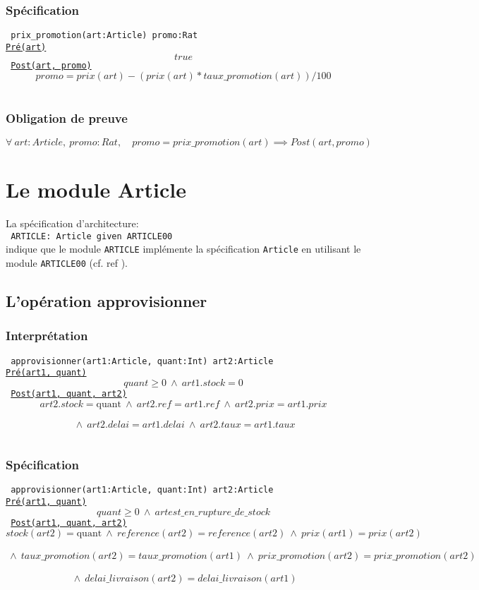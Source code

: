 \documentclass{article}
\begin{document}
\subsubsection{Spécification}
{\tt
prix\_promotion(art:Article) promo:Rat\\
\underline{Pré(art)}
$$ true $$
\underline{Post(art, promo)}
$$ promo = prix(art) - ( prix(art) * taux\_promotion(art) )/100$$
}

\subsubsection{Obligation de preuve}
$$ \forall\ art:Article,\ promo:Rat,\quad promo = prix\_promotion(art) \implies Post(art, promo) $$

\section{Le module Article}
La spécification d'architecture:\\
{\tt
ARTICLE: Article given ARTICLE00\\
}
indique que le module \texttt{ARTICLE} implémente la spécification \texttt{Article} en utilisant le module \texttt{ARTICLE00} (cf. ref \cite{Architectural:specifications:in:CASL}). 

\subsection{L'opération approvisionner}
\subsubsection{Interprétation}
{\tt
approvisionner(art1:Article, quant:Int) art2:Article\\
\underline{Pré(art1, quant)}
$$ quant \ge 0\ \wedge\ art1.stock = 0$$
\underline{Post(art1, quant, art2)}
$$ art2.stock = \text{quant}\ \wedge\ art2.ref = art1.ref\ \wedge\ art2.prix = art1.prix$$
$$ \ \wedge\ art2.delai = art1.delai\ \wedge\  art2.taux = art1.taux$$
}

\subsubsection{Spécification}
{\tt
approvisionner(art1:Article, quant:Int) art2:Article\\
\underline{Pré(art1, quant)}
$$ quant \ge 0\ \wedge\ art est\_en\_rupture\_de\_stock$$
\underline{Post(art1, quant, art2)}
$$ stock(art2) = \text{quant}\ \wedge\ reference(art2) = reference(art2)\ \wedge\ prix(art1) = prix(art2) $$
$$ \ \wedge\ taux\_promotion(art2) = taux\_promotion(art1)\ \wedge\ prix\_promotion(art2) = prix\_promotion(art2)$$
$$ \ \wedge\ delai\_livraison(art2) = delai\_livraison(art1)$$
}
\end{document}
